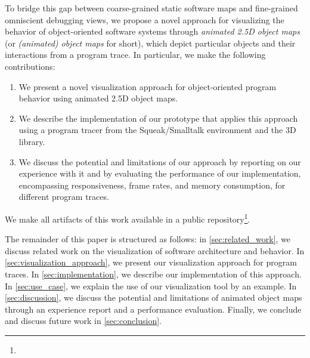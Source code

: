 To bridge this gap between coarse-grained static software maps and fine-grained omniscient debugging views, we propose a novel approach for visualizing the behavior of object-oriented software systems through \emph{animated 2.5D object maps} (or \emph{(animated) object maps} for short), which depict particular objects and their interactions from a program trace.
In particular, we make the following contributions:

\begin{enumerate}
	\item We present a novel visualization approach for ob\-ject-ori\-ent\-ed program behavior using animated 2.5D object maps.
	\item We describe the implementation of our prototype \tfd{} that applies this approach using a program tracer from the Squeak/\?Smalltalk environment and the  3D library.
	\item We discuss the potential and limitations of our approach by reporting on our experience with it and by evaluating the performance of our implementation, encompassing responsiveness, frame rates, and memory consumption, for different program traces.
\end{enumerate}

We make all artifacts of this work available in a public repository\footnote{}.

The remainder of this paper is structured as follows:
in \cref{sec:related_work}, we discuss related work on the visualization of software architecture and behavior.
In \cref{sec:visualization_approach}, we present our visualization approach for program traces.
In \cref{sec:implementation}, we describe our implementation of this approach.
In \cref{sec:use_case}, we explain the use of our visualization tool by an example.
In \cref{sec:discussion}, we discuss the potential and limitations of animated object maps through an experience report and a performance evaluation.
Finally, we conclude and discuss future work in \cref{sec:conclusion}.
